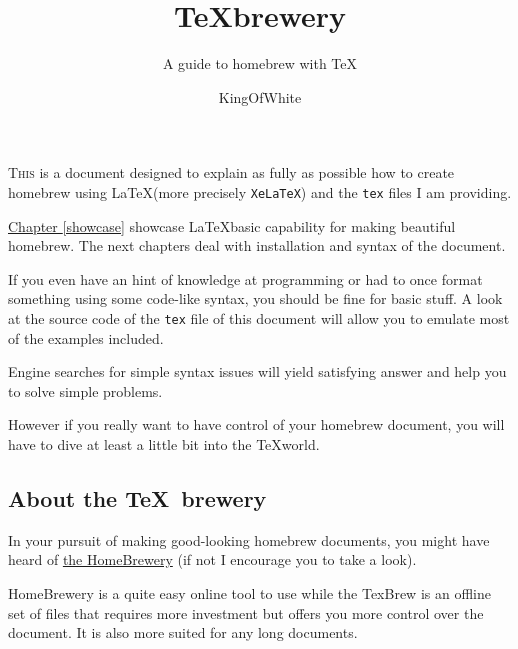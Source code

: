 \documentclass[headings=openany, headings=optiontoheadandtoc]{scrbook}
\title{\TeX brewery}
\author{KingOfWhite}
\subtitle{A guide to homebrew with \TeX}
\newcommand{\TeXBrewery}{\TeX brewery}
\begin{document}

\customtitle

\setcounter{page}{0}

\tableofcontents


\lettrine{T}{his} is a document designed to explain as fully as possible how to create homebrew using \LaTeX (more precisely \texttt{XeLaTeX})  and the \texttt{tex} files I am providing.

\hyperref[showcase]{Chapter \ref{showcase}} showcase \LaTeX  basic capability for making beautiful homebrew. The next chapters deal with installation and syntax of the document.


If you even have an hint of knowledge at programming or had to once format something using some code-like syntax, you should be fine for basic stuff. A look at the source code of the \texttt{tex} file of this document will allow you to emulate most of the examples included.

Engine searches for simple syntax issues will yield satisfying answer and help you to solve simple problems.

However if you really want to have control of your homebrew document, you will have to dive at least a little bit into the \TeX  world.

\subsection{About the \TeXBrewery}

In your pursuit of making good-looking homebrew documents, you might have heard of \href{http://www.naturalcrit.com/homebrew/}{the HomeBrewery} (if not I encourage you to take a look).

HomeBrewery is a quite easy online tool to use while the TexBrew is an offline set of files that requires more investment but offers you more control over the document. It is also more suited for any long documents.
\end{document}
